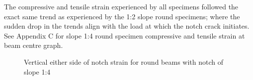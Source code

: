 \documentclass[11pt,a4paper]{article}
\numberwithin{equation}{subsection}
\begin{document}
\vspace*{\baselineskip}
\noindent
The compressive and tensile strain experienced by all specimens followed the exact same trend as experienced by the 1:2 slope round specimens; where the sudden drop in the trends align with the load at which the notch crack initiates. See Appendix C for slope 1:4 round specimen compressive and tensile strain at beam centre graph.

\begin{figure}[h]
	\begin{center}
	\end{center}
	\caption{Vertical either side of notch strain for round beams with notch of slope 1:4}
	\label{fig:Round_14_ZY}
\end{figure}
\pagebreak
\end{document}
